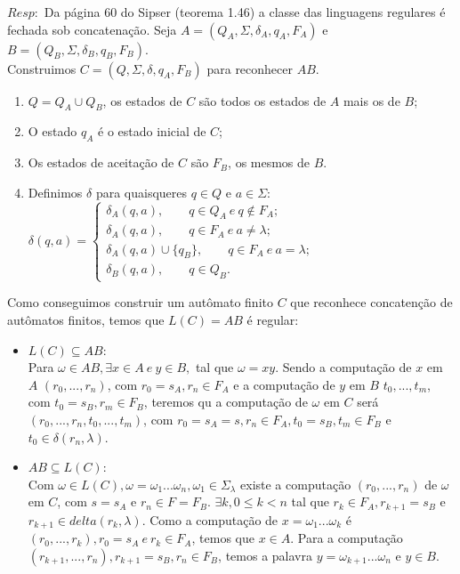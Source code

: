 \documentclass{homework}
\begin{document}
	$Resp:$ Da página 60 do Sipser (teorema 1.46) a classe das linguagens regulares é fechada sob concatenação.
	Seja $A =(Q_A,\Sigma,\delta_A,q_A,F_A)$ e $B = (Q_B,\Sigma,\delta_B,q_B,F_B)$.\\
	Construimos $C = (Q,\Sigma,\delta,q_A,F_B)$ para reconhecer $AB$.
	\begin{enumerate}
		\item $Q = Q_A \cup Q_B$, os estados de $C$ são todos os estados de $A$ mais os de $B$;
		\item O estado $q_A$ é o estado inicial de $C$;
		\item Os estados de aceitação de $C$ são $F_B$, os mesmos de $B$. 
		\item Definimos $\delta$ para quaisqueres $q \in Q$ e $a \in \Sigma$:\\
		$\delta(q,a) = \begin{cases}
							\delta_A(q,a),\qquad q \in Q_A \ e \ q \notin F_A;\\
							\delta_A(q,a),\qquad q \in F_A \ e \ a \neq \lambda;\\
							\delta_A(q,a) \cup \{q_B\},\qquad q \in F_A \ e \ a = \lambda;\\
							\delta_B(q,a), \qquad  q \in Q_B.
					   \end{cases}					  
		$
	\end{enumerate}
	Como conseguimos construir um autômato finito $C$ que reconhece concatenção de autômatos finitos, temos que $L(C) = AB$ é regular:
	\begin{itemize}
		\item $L(C) \subseteq AB$:\\
			Para $\omega \in AB, \exists x \in A\ e\ y \in B,$ tal que $\omega=xy$. Sendo a computação de $x$ em $A$ $(r_0,...,r_n)$, com $r_0=s_A,r_n \in F_A$ e a computação de $y$ em $B$ $t_0,...,t_m$, com $t_0=s_B,r_m \in F_B$, teremos qu a computação de $\omega$ em $C$ será $(r_0,...,r_n,t_0,...,t_m)$, com $r_0=s_A=s,r_n \in F_A, t_0=s_B,t_m \in F_B$ e $t_0 \in \delta(r_n,\lambda)$.
		\item $AB \subseteq L(C)$:\\
			Com $\omega \in L(C), \omega=\omega_1...\omega_n, \omega_1 \in \Sigma_\lambda$ existe a computação $(r_0,...,r_n)$ de $\omega$ em $C$, com $s=s_A$ e $r_n \in F=F_B$. $\exists k, 0 \leq k < n$ tal que $r_k \in F_A,r_{k+1}=s_B$ e $r_{k+1} \in delta(r_k, \lambda)$. Como a computação de $x=\omega_1...\omega_k$ é $(r_0,...,r_k), r_0=s_A\ e\ r_k \in F_A$, temos que $x \in A$. Para a computação $(r_{k+1},...,r_n),r_{k+1}=s_B,r_n \in F_B$, temos a palavra $y=\omega_{k+1}...\omega_n$ e $y \in B$.
	\end{itemize}
\end{document}
